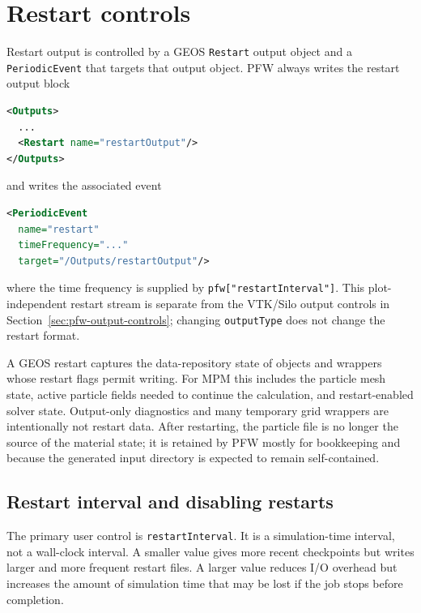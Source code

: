 \section{Restart controls}
\label{sec:pfw-restart-controls}

Restart output is controlled by a GEOS \texttt{Restart} output object and a \texttt{PeriodicEvent} that targets that output object.  PFW always writes the restart output block
\begin{lstlisting}[language=XML,caption={GEOS restart output block written by PFW.}]
<Outputs>
  ...
  <Restart name="restartOutput"/>
</Outputs>
\end{lstlisting}
and writes the associated event
\begin{lstlisting}[language=XML,caption={GEOS restart event written by PFW.}]
<PeriodicEvent
  name="restart"
  timeFrequency="..."
  target="/Outputs/restartOutput"/>
\end{lstlisting}
where the time frequency is supplied by \texttt{pfw["restartInterval"]}.  This plot-independent restart stream is separate from the VTK/Silo output controls in Section~\ref{sec:pfw-output-controls}; changing \texttt{outputType} does not change the restart format.

A GEOS restart captures the data-repository state of objects and wrappers whose restart flags permit writing.  For MPM this includes the particle mesh state, active particle fields needed to continue the calculation, and restart-enabled solver state.  Output-only diagnostics and many temporary grid wrappers are intentionally not restart data.  After restarting, the particle file is no longer the source of the material state; it is retained by PFW mostly for bookkeeping and because the generated input directory is expected to remain self-contained.

\subsection{Restart interval and disabling restarts}
\label{sec:pfw-restart-interval}

The primary user control is \texttt{restartInterval}.  It is a simulation-time interval, not a wall-clock interval.  A smaller value gives more recent checkpoints but writes larger and more frequent restart files.  A larger value reduces I/O overhead but increases the amount of simulation time that may be lost if the job stops before completion.

